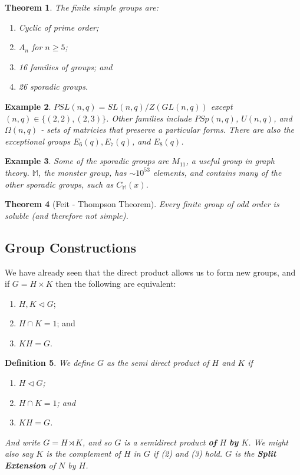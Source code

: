 \documentclass[a4paper,10pt]{article}
\newtheorem{thm}{Theorem}
\newtheorem{Def}[thm]{Definition}
\newtheorem{eg}[thm]{Example}
\begin{document}
\begin{thm}
The finite simple groups are:
\begin{enumerate}
\item Cyclic of prime order;
\item $A_n$ for $n \geq 5$; 
\item 16 families of groups; and
\item 26 sporadic groups.
\end{enumerate}
\end{thm}

\begin{eg}
$PSL(n,q) = SL(n,q) / Z(GL(n,q))$ except $(n,q) \in  \{(2,2), (2,3)\}$. Other families include $PSp(n,q)$, $U(n,q)$, and $\Omega(n,q)$ - sets of matricies that preserve a particular forms. There are also the exceptional groups $E_6(q), E_7(q)$, and $E_8(q)$. 
\end{eg}

\begin{eg}
Some of the sporadic groups are $M_{11}$, a useful group in graph theory. $\mathbb{M}$, the monster group, has $\sim 10^{53}$ elements, and contains many of the other sporadic groups, such as $C_\mathbb{M}(x)$. 
\end{eg}

\begin{thm}[Feit - Thompson Theorem]
Every finite group of odd order is soluble (and therefore not simple).
\end{thm}



\subsection{Group Constructions}

We have already seen that the direct product allows us to form new groups, and if $G = H \times K$ then the following are equivalent:\begin{enumerate}
\item $H, K \triangleleft G$;
\item $H \cap K = 1$; and
\item $KH = G$. 
\end{enumerate}

\begin{Def}
We define $G$ as the semi direct product of $H$ and $K$ if
\begin{enumerate}
\item $H \triangleleft G$;
\item $H \cap K = 1$; and
\item $KH = G$. 
\end{enumerate}
And write $G = H \rtimes K$, and so $G$ is a semidirect product \textbf{of} $H$ \textbf{by} $K$. We might also say $K$ is the complement of $H$ in $G$ if (2) and (3) hold. $G$ is the \textbf{Split Extension} of $N$ by $H$.
\end{Def}
\end{document}
